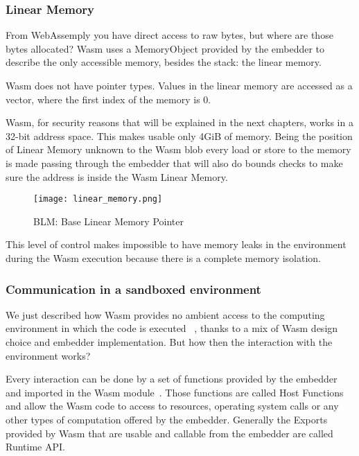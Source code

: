 \documentclass[../main.tex]{subfiles}
\begin{document}
\subsubsection{Linear Memory}

From WebAssemply you have direct access to raw bytes, but where are  those bytes allocated? Wasm uses a MemoryObject provided by the embedder to describe the only accessible memory, besides the stack: the linear memory.~\cite{linear-memory}

Wasm does not have pointer types. Values in the linear memory are accessed as a vector, where the first index of the memory is 0.

Wasm, for security reasons that will be explained in the next chapters, works in a 32-bit address space. This makes usable only 4GiB of memory. Being the position of Linear Memory unknown to the Wasm blob every load or store to the memory is made passing through the embedder that will also do bounds checks to make sure the address is inside the Wasm Linear Memory.

\begin{figure}[h]
  \centering
  \texttt{[image: linear\_memory.png]}
  \caption{BLM: Base Linear Memory Pointer}
  \label{fig:linear_memory}
\end{figure}

This level of control makes impossible to have memory leaks in the environment during the Wasm execution because there is a complete memory isolation. ~\cite{linear-memory}

\subsubsection{Communication in a sandboxed environment}

We just described how Wasm provides no ambient access to the computing environment in which the code is executed ~\cite{wasm-core-spec}, thanks to a mix of Wasm design choice and embedder implementation. But how  then the interaction with the environment works?

Every interaction can be done by a set of functions provided by the embedder and imported in the Wasm module~\cite{wasm-core-spec}. Those functions are called Host Functions and allow the Wasm code to access to resources, operating system calls or any other types of computation offered by the embedder. Generally the Exports provided by Wasm that are usable and callable from the embedder are called Runtime API.
\end{document}
